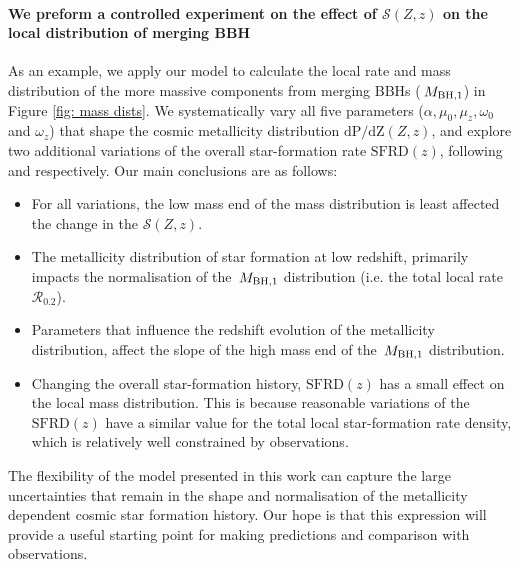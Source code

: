 \documentclass[twocolumn]{aastex631}
\newcommand{\Msun}{\ensuremath{\rm{M}_{\odot}}\xspace}
\newcommand{\Mbheen}{\ensuremath{\,M_{\rm BH, 1}}\xspace}
\newcommand{\SFRDzZ}{\ensuremath{\mathcal{S}(Z,z)}\xspace}
\newcommand{\SFRDz}{\ensuremath{\mathrm{SFRD}(z)}\xspace}
\newcommand{\dpdZ}{\ensuremath{\mathrm{dP/dZ}(Z,z)}\xspace}
\begin{document}
\paragraph{We preform a controlled experiment on the effect of \SFRDzZ on the local distribution of merging BBH}
As an example, we apply our model to calculate the local rate and mass distribution of the more massive components from merging BBHs (\Mbheen) in Figure \ref{fig: mass dists}. 
We systematically vary all five parameters ($\alpha, \mu_0, \mu_z, \omega_0$ and $\omega_z$) that shape the cosmic metallicity distribution \dpdZ, and explore two additional variations of the overall star-formation rate \SFRDz, following \cite{Madau+2017} and \cite{Neijssel+2019} respectively. 
Our main conclusions are as follows:
\begin{itemize}
    
    \item For all variations, the low mass end of the mass distribution is least affected the change in the \SFRDzZ. 
    
    \item The metallicity distribution of star formation at low redshift, primarily impacts the normalisation of the \Mbheen distribution (i.e. the total local rate $\mathcal{R}_{0.2}$).
    
    \item Parameters that influence the redshift evolution of the metallicity distribution, affect the slope of the high mass end of the \Mbheen distribution. %
    
    \item Changing the overall star-formation history, \SFRDz has a small effect on the local mass distribution. This is because reasonable variations of the \SFRDz have a similar value for the total local star-formation rate density, which is relatively well constrained by observations. 
    
\end{itemize}

The flexibility of the model presented in this work can capture the large uncertainties that remain in the shape and normalisation of the metallicity dependent cosmic star formation history. 
Our hope is that this expression will provide a useful starting point for making predictions and comparison with observations.
\end{document}
